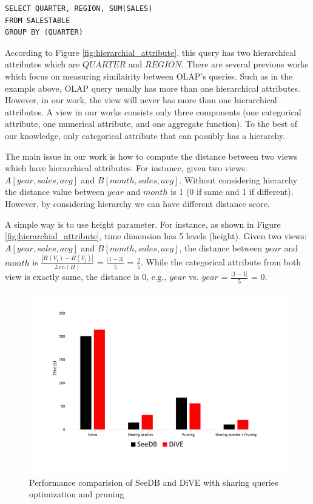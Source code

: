 \documentclass{article}
\begin{document}
\begin{verbatim}
SELECT QUARTER, REGION, SUM(SALES)
FROM SALESTABLE
GROUP BY (QUARTER)
\end{verbatim}

According to Figure \ref{fig:hierarchial_attribute}, this query has two hierarchical attributes which are $QUARTER$ and $REGION$. There are several previous works which focus on measuring similairity between OLAP's queries. Such as in the example above, OLAP query usually has more than one hierarchical attributes. However, in our work, the view will never has more than one hierarchical attributes. A view in our works consists only three components (one categorical attribute, one numerical attribute, and one aggregate function). To the best of our knowledge, only categorical attribute that can possibly has a hierarchy. 

The main issue in our work is how to compute the distance between two views which have hierarchical attributes. For instance, given two views: $A [year, sales, avg]$ and $B [month, sales, avg]$. Without considering hierarchy the distance value between $year$ and $month$ is 1 (0 if same and 1 if different). However, by considering hierarchy we can have different distance score. 

A simple way is to use height parameter. For instance, as shown in Figure \ref{fig:hierarchial_attribute}, time dimension has 5 levels (height). Given two views: $A [year, sales, avg]$ and $B [month, sales, avg]$, the distance between $year$ and $month$ is $\frac{|H(V_i) - H(V_j)|}{Len(H)}$ =  $ \frac{|1 - 3|}{5} $ = $\frac{2}{5}$. While the categorical attribute from both view is exactly same, the distance is 0, e.g., $year$ vs. $year$ =  $ \frac{|1 - 1|}{5} $ = 0.


\begin{figure}%
	\centering
	\includegraphics[width=5.2in]{figures/SeeDB_vs_DiVE}
	\caption{Performance comparision of SeeDB and DiVE with sharing queries optimization and pruning}
	\label{fig:SeeDB_vs_DiVE}%
\end{figure}
\end{document}
